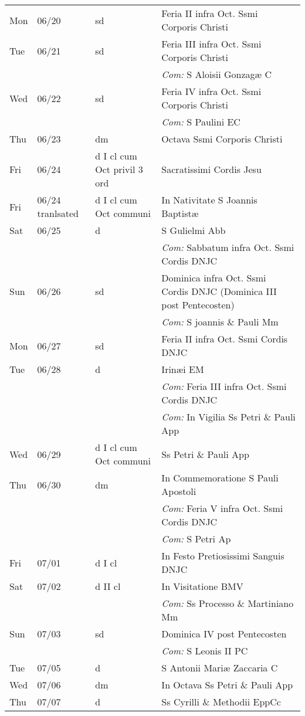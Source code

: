 \documentclass[10pt]{article}
\begin{document}
\begin{longtable}{ l l l l }
Mon & 06/20 & sd & Feria II infra Oct. Ssmi Corporis Christi\\
Tue & 06/21 & sd & Feria III infra Oct. Ssmi Corporis Christi\\
 & & & \textit{Com:} S Aloisii Gonzagæ C\\
Wed & 06/22 & sd & Feria IV infra Oct. Ssmi Corporis Christi\\
 & & & \textit{Com:} S Paulini EC\\
Thu & 06/23 & dm & Octava Ssmi Corporis Christi\\
Fri & 06/24 & d I cl cum Oct privil 3 ord & Sacratissimi Cordis Jesu\\
Fri & 06/24 tranlsated & d I cl cum Oct communi & In Nativitate S Joannis Baptistæ\\
Sat & 06/25 & d & S Gulielmi Abb\\
 & & & \textit{Com:} Sabbatum infra Oct. Ssmi Cordis DNJC\\
Sun & 06/26 & sd & Dominica infra Oct. Ssmi Cordis DNJC (Dominica III post Pentecosten)\\
 & & & \textit{Com:} S joannis \& Pauli Mm\\
Mon & 06/27 & sd & Feria II infra Oct. Ssmi Cordis DNJC\\
Tue & 06/28 & d & Irinæi EM\\
 & & & \textit{Com:} Feria III infra Oct. Ssmi Cordis DNJC\\
 & & & \textit{Com:} In Vigilia Ss Petri \& Pauli App\\
Wed & 06/29 & d I cl cum Oct communi & Ss Petri \& Pauli App\\
Thu & 06/30 & dm & In Commemoratione S Pauli Apostoli\\
 & & & \textit{Com:} Feria V infra Oct. Ssmi Cordis DNJC\\
 & & & \textit{Com:} S Petri Ap\\
Fri & 07/01 & d I cl & In Festo Pretiosissimi Sanguis DNJC\\
Sat & 07/02 & d II cl & In Visitatione BMV\\
 & & & \textit{Com:} Ss Processo \& Martiniano Mm\\
Sun & 07/03 & sd & Dominica IV post Pentecosten\\
 & & & \textit{Com:} S Leonis II PC\\
Tue & 07/05 & d & S Antonii Mariæ Zaccaria C\\
Wed & 07/06 & dm & In Octava Ss Petri \& Pauli App\\
Thu & 07/07 & d & Ss Cyrilli \& Methodii EppCc\\

\end{longtable}
\end{document}

